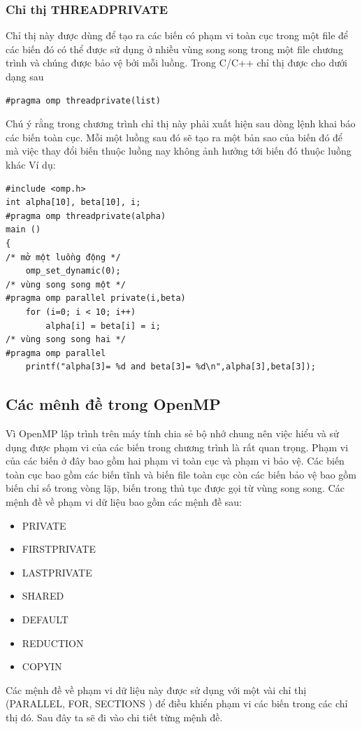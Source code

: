 \documentclass{report}
\begin{document}
\subsubsection{Chỉ thị THREADPRIVATE}
Chỉ thị này được dùng để tạo ra các biến có phạm vi toàn cục trong một file để
các biến đó có thể được sử dụng ở nhiều vùng song song trong một file chương trình
và chúng được bảo vệ bởi mỗi luồng. Trong C/C++ chỉ thị được cho dưới dạng sau
\begin{verbatim}
#pragma omp threadprivate(list)
\end{verbatim}
Chú ý rằng trong chương trình chỉ thị này phải xuất hiện sau dòng lệnh khai
báo các biến toàn cục. Mỗi một luồng sau đó sẽ tạo ra một bản sao của biến đó để mà
việc thay đổi biến thuộc luồng nay không ảnh hưởng tới biến đó thuộc luồng khác
Ví dụ:
\begin{verbatim}
#include <omp.h>
int alpha[10], beta[10], i;
#pragma omp threadprivate(alpha)
main ()
{
/* mở một luồng động */
	omp_set_dynamic(0);
/* vùng song song một */
#pragma omp parallel private(i,beta)
	for (i=0; i < 10; i++)
		alpha[i] = beta[i] = i;
/* vùng song song hai */
#pragma omp parallel
	printf("alpha[3]= %d and beta[3]= %d\n",alpha[3],beta[3]);
\end{verbatim}

\subsection{Các mênh đề trong OpenMP}
Vì OpenMP lập trình trên máy tính chia sẻ bộ nhớ chung nên việc hiểu và sử
dụng được phạm vi của các biến trong chương trình là rất quan trọng. Phạm vi của các
biến ở đây bao gồm hai phạm vi toàn cục và phạm vi bảo vệ. Các biến toàn cục bao
gồm các biến tĩnh và biến file toàn cục còn các biến bảo vệ bao gồm biến chỉ số trong
vòng lặp, biến trong thủ tục được gọi từ vùng song song. Các mệnh đề về phạm vi dữ
liệu bao gồm các mệnh đề sau:
\begin{itemize}
	\item PRIVATE
	\item FIRSTPRIVATE
	\item LASTPRIVATE
	\item SHARED
	\item DEFAULT
	\item REDUCTION
	\item COPYIN
	\end{itemize}
Các mệnh đề về phạm vi dữ liệu này được sử dụng với một vài chỉ thị
(PARALLEL, FOR, SECTIONS ) để điều khiển phạm vi các biến trong các
chỉ thị đó. Sau đây ta sẽ đi vào chi tiết từng mệnh đề.
\end{document}

